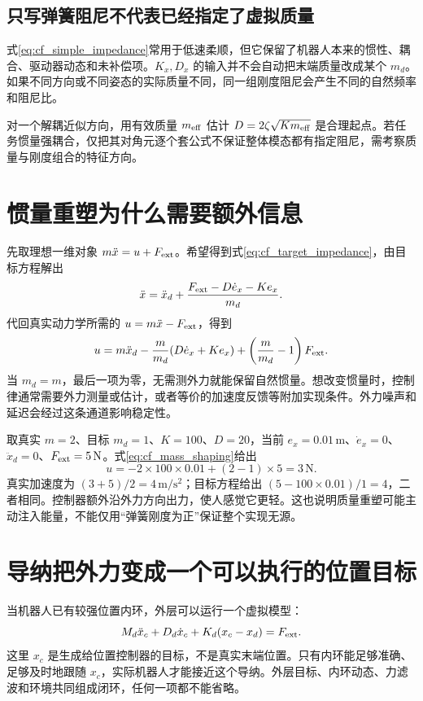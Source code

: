 \subsection{只写弹簧阻尼不代表已经指定了虚拟质量}

式\eqref{eq:cf_simple_impedance}常用于低速柔顺，但它保留了机器人本来的惯性、耦合、驱动器动态和未补偿项。$K_x,D_x$ 的输入并不会自动把末端质量改成某个 $m_d$。如果不同方向或不同姿态的实际质量不同，同一组刚度阻尼会产生不同的自然频率和阻尼比。

对一个解耦近似方向，用有效质量 $m_{\rm eff}$ 估计 $D=2\zeta\sqrt{Km_{\rm eff}}$ 是合理起点。若任务惯量强耦合，仅把其对角元逐个套公式不保证整体模态都有指定阻尼，需考察质量与刚度组合的特征方向。

\section{惯量重塑为什么需要额外信息}

先取理想一维对象 $m\ddot x=u+F_{\rm ext}$。希望得到式\eqref{eq:cf_target_impedance}，由目标方程解出
\[
\ddot x=\ddot x_d+\frac{F_{\rm ext}-D\dot e_x-Ke_x}{m_d}.
\]
代回真实动力学所需的 $u=m\ddot x-F_{\rm ext}$，得到
\begin{equation}
u=m\ddot x_d-\frac m{m_d}(D\dot e_x+Ke_x)
+\left(\frac m{m_d}-1\right)F_{\rm ext}.
\label{eq:cf_mass_shaping}
\end{equation}
当 $m_d=m$，最后一项为零，无需测外力就能保留自然惯量。想改变惯量时，控制律通常需要外力测量或估计，或者等价的加速度反馈等附加实现条件。外力噪声和延迟会经过这条通道影响稳定性。

\begin{examplebox}[算例 15E 把2 kg的对象表现成1 kg]
取真实 $m=2$、目标 $m_d=1$、$K=100$、$D=20$，当前 $e_x=0.01\,\mathrm{m}$、$\dot e_x=0$、$\ddot x_d=0$、$F_{\rm ext}=5\,\mathrm{N}$。式\eqref{eq:cf_mass_shaping}给出
\[
u=-2\times100\times0.01+(2-1)\times5=3\,\mathrm{N}.
\]
真实加速度为 $(3+5)/2=4\,\mathrm{m/s^2}$；目标方程给出 $(5-100\times0.01)/1=4$，二者相同。控制器额外沿外力方向出力，使人感觉它更轻。这也说明质量重塑可能主动注入能量，不能仅用“弹簧刚度为正”保证整个实现无源。
\end{examplebox}

\section{导纳把外力变成一个可以执行的位置目标}

当机器人已有较强位置内环，外层可以运行一个虚拟模型：
\begin{equation}
M_d\ddot x_c+D_d\dot x_c+K_d(x_c-x_d)=F_{\rm ext}.
\end{equation}
这里 $x_c$ 是生成给位置控制器的目标，不是真实末端位置。只有内环能足够准确、足够及时地跟随 $x_c$，实际机器人才能接近这个导纳。外层目标、内环动态、力滤波和环境共同组成闭环，任何一项都不能省略。

